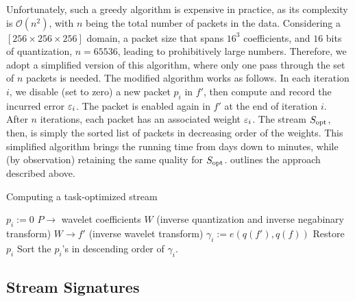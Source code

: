 Unfortunately, such a greedy algorithm is expensive in practice, as its
complexity is $\mathcal{O}(n^2)$, with $n$ being the total number of packets in
the data.  Considering a $[256 \times 256 \times 256]$ domain,  a packet size
that spans $16^3$ coefficients, and $16$ bits of quantization, $n = 65536$,
leading to prohibitively large numbers. Therefore, we adopt a simplified version
of this algorithm, where only one pass through the set of $n$ packets is
needed.  The modified algorithm works as follows. In each iteration $i$, we
disable (set to zero) a new packet $p_i$ in $f'$, then compute and record the
incurred error $\err_i$. The packet is enabled again in $f'$ at the end of
iteration $i$. After $n$ iterations, each packet has an associated weight
$\err_i$.  The stream $\sopt$, then, is simply the sorted list of packets in
decreasing order of the weights. This simplified algorithm brings the running
time from days down to minutes, while (by observation) retaining the same
quality for $\sopt$.  outlines the approach described above.

\begin{algorithm}[h]
  \small
  \caption{Computing a task-optimized stream}
  \begin{algorithmic}[1]
			\State $p_i := 0$
      \State $P \rightarrow$ wavelet coefficients $W$ (inverse quantization and inverse negabinary transform)
			\State $W \rightarrow f'$ (inverse wavelet transform)
			\State $\gamma_i := e(q(f'),q(f))$			
			\State Restore $p_i$
		\EndFor
		\State Sort the $p_i$'s in descending order of $\gamma_i$.
	\end{algorithmic}
	\label{alg:greedy}
\end{algorithm}

\subsection{Stream Signatures} \label{sec:stream-signature}

